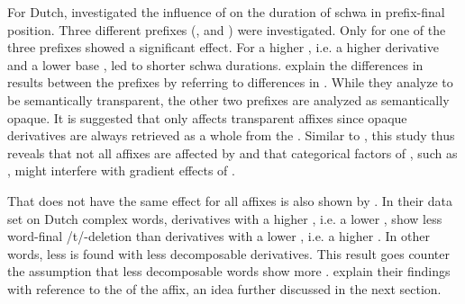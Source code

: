  For Dutch, \cite{Hanique.2011} investigated the influence of  on the duration of schwa in prefix-final position. Three different prefixes (,  and ) were investigated. Only for one of the three prefixes  showed a significant effect. For  a higher , i.e. a higher derivative  and a lower base , led to shorter schwa durations.
 \cite{Hanique.2011} explain the differences in results between the prefixes by referring to differences in . While they analyze  to be semantically transparent, the other two prefixes are analyzed as semantically opaque. It is suggested that  only affects transparent affixes since opaque derivatives are always  retrieved as a whole from the . Similar to \cite{Collie.2008}, this study thus reveals that not all affixes are affected by  and that categorical factors of , such as , might interfere with gradient effects of . 


That  does not have the same effect for all affixes is also shown by \cite{Schuppler.2012}. In their data set on Dutch complex words, derivatives with a higher , i.e. a lower , show less word-final /t/-deletion than derivatives with a lower , i.e. a higher . In other words, less  is found with less decomposable derivatives. This result goes counter the assumption that less decomposable words show more . \cite{Schuppler.2012} explain their findings with reference to the  of the affix, an idea further discussed in the next section.

